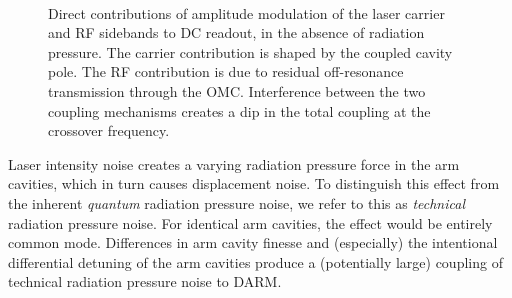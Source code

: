 \begin{figure}
\\
\caption[Components of laser intensity noise contribution to DC readout]{\label{fig:laser-AM-contributions}Direct contributions of
  amplitude modulation of the laser carrier and RF sidebands to DC
  readout, in the absence of radiation pressure.  The carrier
  contribution is shaped by the coupled cavity pole.  The RF
  contribution is due to residual off-resonance transmission through
  the OMC.  Interference between the two coupling mechanisms creates a
  dip in the total coupling at the crossover frequency.}
\end{figure}

Laser intensity noise creates a varying radiation pressure force in the arm
cavities, which in turn causes displacement noise.  To distinguish this effect
from the inherent \emph{quantum} radiation pressure
noise\cite{Caves1980QuantumMechanical}, we refer to this as \emph{technical}
radiation pressure noise.  For identical arm cavities, the effect would be
entirely common mode.  Differences in arm cavity finesse and (especially) the
intentional differential detuning of the arm cavities produce a (potentially
large\cite{ChaibiOptomechanical}) coupling of technical radiation pressure noise
to DARM.

